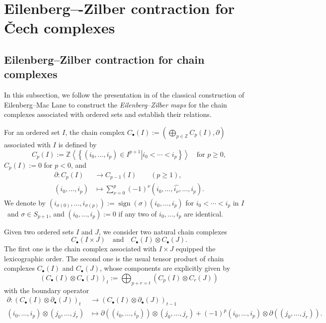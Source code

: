 \appendix



\section{Eilenberg–-Zilber contraction for \v{C}ech complexes}\label{sec:Eilenberg-Zilber-constraction}


\subsection{Eilenberg--Zilber contraction for chain complexes}


In this subsection,
we follow
the presentation in \cite[\S 3]{Franz} of
the classical construction of Eilenberg--Mac Lane
\cite{EilenbergMacLane1953,EilenbergMacLane1954}
to construct the \emph{Eilenberg--Zilber maps}
for the chain complexes
associated with ordered sets and establish their relations.


For an ordered set $I$,
the chain complex
$
C_{\bullet}(I)
:=
\left(\bigoplus_{p\in\mathbb{Z}}C_p(I),\partial\right)
$
associated with $I$ is defined
by
$$
C_p(I)
:=
\mathbb{Z}\left<\left\{\left.(i_0,\dots,i_p)\in I^{p+1}\right|i_0<\cdots<i_p\right\}\right>
\quad\text{for }p\ge0,
$$
$C_p(I):=0$
for $p<0$,
and
\begin{align*}
\partial:C_p(I)
&\rightarrow
C_{p-1}(I)
\qquad
(p\ge 1),
\\
(i_0,\dots,i_p)
&\mapsto
\sum_{\nu=0}^p
(-1)^{\nu}
(i_0,\dots,\hat{i_{\nu}},\dots,i_p).
\end{align*}
We denote by
$
(i_{\sigma(0)},\dots,i_{\sigma(p)})
:=
\operatorname{sign}(\sigma)
(i_0,\dots,i_p)
$
for $i_0<\cdots<i_p$ in $I$\ and $\sigma\in S_{p+1}$,
and
$(i_0,\dots,i_p):=0$
if any two of $i_0,\dots,i_p$ are identical.





Given two ordered sets $I$ and $J$,
we consider two natural chain complexes
$$
C_{\bullet}(I\times J)
\quad\text{and}\quad
C_{\bullet}(I)\otimes C_{\bullet}(J).
$$
The first one is the chain complex associated with $I\times J$
equipped the lexicographic order.
The second one is the usual tensor product of chain complexes
$C_{\bullet}(I)$ and $C_{\bullet}(J)$,
whose components are explicitly given by
$$
(C_{\bullet}(I)\otimes C_{\bullet}(J))_t
:=
\bigoplus_{p+r=t}
\left(C_p(I)\otimes C_r(J)\right)
$$
with the boundary operator
\begin{align*}
\partial:
(C_{\bullet}(I)\otimes \partial_{\bullet}(J))_t
&\rightarrow
(C_{\bullet}(I)\otimes \partial_{\bullet}(J))_{t-1}
\\[2mm]
(i_0,\dots,i_p)\otimes(j_0,\dots,j_r)
&\mapsto
\partial((i_0,\dots,i_p))\otimes(j_0,\dots,j_r)
+
(-1)^p
(i_0,\dots,i_p)\otimes\partial((j_0,\dots,j_r)).
\end{align*}




